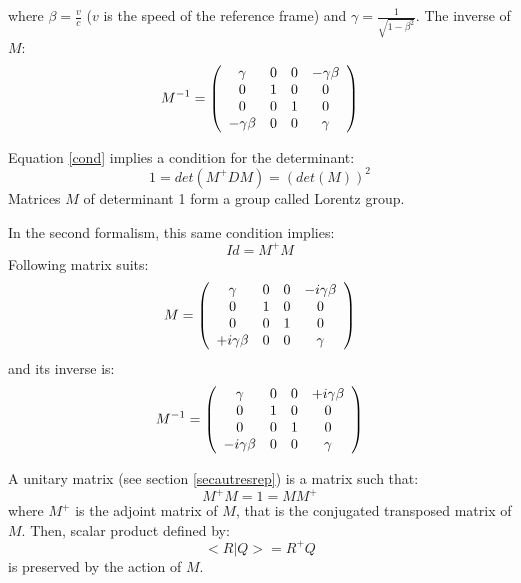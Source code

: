 \documentclass[12pt]{book}
\begin{document}
where $\beta=\frac{v}{c}$ ($v$ is the speed of the reference frame) and
$\gamma=\frac{1}{\sqrt{1-\beta^2}}$. 
The inverse of $M$:
\begin{equation}
M^{-1}=
\left( \begin{array}{cccc}
\gamma&0&0&-\gamma \beta \cr
0&1&0&0\cr
0&0&1&0\cr
-\gamma \beta&0&0&\gamma\cr
          \end{array} \right)
\end{equation}
\begin{rem}
Equation \ref{cond} implies a condition for the determinant:
\begin{equation}
1=det(M^+DM)=(det(M))^2
\end{equation}
Matrices $M$ of determinant 1 form a group called Lorentz group.
 \end{rem}
In the second formalism, this same condition implies:
\begin{equation}
Id=M^+M
\end{equation}
Following matrix suits:
\begin{equation}
M=
\left( \begin{array}{cccc}
\gamma&0&0&-i\gamma \beta \cr
0&1&0&0\cr
0&0&1&0\cr
+i\gamma \beta&0&0&\gamma\cr
          \end{array} \right)
\end{equation}
and its inverse is:
\begin{equation}
M^{-1}=
\left( \begin{array}{cccc}
\gamma&0&0&+i\gamma \beta \cr
0&1&0&0\cr
0&0&1&0\cr
-i\gamma \beta&0&0&\gamma\cr
\end{array} \right)          
\end{equation}
\begin{rem}
A unitary matrix (see section \ref{secautresrep}) is a matrix such that:
\begin{equation}
M^+M=1=MM^+
\end{equation}
where $M^+$ is the adjoint matrix of $M$, that is the conjugated transposed
matrix of $M$. Then, scalar product defined by:
\begin{equation}
 \mathrel{<} R|Q\mathrel{>} =R^+Q
\end{equation}
is preserved by the action of $M$.
\end{rem}
\end{document}
